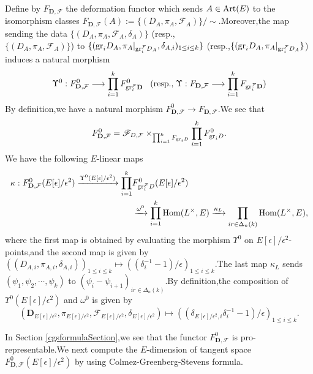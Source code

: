 \documentclass[SecEq,CM,GP]{degruyter-crelle} %
\theoremstyle{plain}
\newcommand{\Art}{{\rm Art}}
\newcommand{\Dpik}{{\mathbf{D}}}
\newcommand{\gr}{{\rm gr}}
\newcommand{\homo}{{\rm Hom}}
\newcommand{\cF}{\mathcal F}
\newcommand{\sF}{\mathscr F}
\begin{document}
Define by $F_{\Dpik,\cF}$ the deformation functor  which sends $A\in \Art(E)$ to the isomorphism classes $F_{\Dpik,\cF}(A):=\{(D_A,\pi_A,\cF_A)\}/\sim$.\;Moreover,\;the map sending the data $\{(D_A,\pi_A,\cF_A,\delta_A)\}$ (resp.,\;\\$\{(D_A,\pi_A,\cF_A)\}$) to $\{(\gr_iD_A,\pi_A|_{\gr_i^{\cF}D_A},{\delta}_{A,i})_{1\leq i\leq k}\}$ (resp.,\;$\{(\gr_iD_A,\pi_A|_{\gr_i^{\cF}D_A}\}$) induces a natural morphism
\begin{equation}\label{FmorphismGRD}
\Upsilon^0:F_{\Dpik,\cF}^0\longrightarrow \prod_{i=1}^kF_{\gr_i^{\cF}\Dpik}^0\;\;\; (\text{resp.,\;}\Upsilon:F_{\Dpik,\cF}\longrightarrow \prod_{i=1}^kF_{\gr_i^{\cF}\Dpik})
\end{equation}
By definition,\;we have a natural morphism $F_{\Dpik,\cF}^0\rightarrow F_{\Dpik,\cF}$.\;We see that
\[F_{\Dpik,\cF}^0=\sF_{D,\cF}\times_{\prod_{i=1}^k F_{\gr_iD}}\prod_{i=1}^k F_{\gr_iD}^0.\]
We have the following $E$-linear maps
\begin{equation}\label{kappakappaL}
\begin{aligned}
	\kappa:F_{\Dpik,\cF}^0(E[\epsilon]/\epsilon^2)\xrightarrow{\Upsilon^0(E[\epsilon]/\epsilon^2)} \prod_{i=1}^k&F_{\gr_i^{\cF}D}^0(E[\epsilon]/\epsilon^2)\\
	&\xrightarrow{\omega^0} \prod_{i=1}^k\homo(L^\times,E)\xrightarrow{\kappa_L} \prod_{ir\in \Delta_n(k)}\homo(L^\times,E),
\end{aligned}
\end{equation}
where the first map is obtained by evaluating the morphism $\Upsilon^0$ on $E[\epsilon]/\epsilon^2$-points,\;and the second map is given by 
$((D_{A,i},\pi_{A,i},\delta_{A,i}))_{1\leq i\leq k} 
\mapsto((
\delta_i^{-1}-1)/\epsilon)_{1\leq i\leq k}$.\;The last map $\kappa_L$ sends $(\psi_1,\psi_2,\cdots,\psi_k)$ to $(\psi_i-\psi_{i+1})_{ir\in \Delta_n(k)}$.\;By definition,\;the composition of $\Upsilon^0(E[\epsilon]/\epsilon^2)$ and  $\omega^0$ is given by
\[(\Dpik_{E[\epsilon]/\epsilon^2},\pi_{E[\epsilon]/\epsilon^2},\cF_{E[\epsilon]/\epsilon^2},\delta_{E[\epsilon]/\epsilon^2})\mapsto (({\delta}_{E[\epsilon]/\epsilon^2,i}\delta_i^{-1}-1)/\epsilon)_{1\leq i\leq k}.\]

In Section \ref{cgsformulaSection},\;we see that the functor $F_{\Dpik,\cF}^0$ is pro-representable.\;We next compute the $E$-dimension of tangent space  $F_{\Dpik,\cF}^0(E[\epsilon]/\epsilon^2)$ \;by using Colmez-Greenberg-Stevens formula.\;
\end{document}
